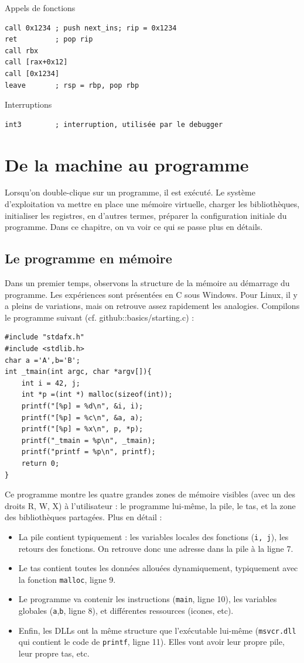 \documentclass{book}
\newcommand{\C}{\textsc{C}\xspace}
\newcommand{\code}[1]{\texttt{#1}}
\begin{document}
Appels de fonctions
\begin{verbatim}
call 0x1234 ; push next_ins; rip = 0x1234
ret         ; pop rip
call rbx
call [rax+0x12]
call [0x1234]
leave       ; rsp = rbp, pop rbp
\end{verbatim}

Interruptions
\begin{verbatim}
int3        ; interruption, utilisée par le debugger
\end{verbatim}

\chapter{De la machine au programme}

Lorsqu'on double-clique sur un programme, il est exécuté. Le système d'exploitation va mettre en place une mémoire virtuelle, charger les bibliothèques, initialiser les registres, en d'autres termes, préparer la configuration initiale du programme. Dans ce chapitre, on va voir ce qui se passe plus en détails. 

\section{Le programme en mémoire}

Dans un premier temps, observons la structure de la mémoire au démarrage du programme. Les expériences sont présentées en \C sous Windows. Pour Linux, il y a pleins de variations, mais on retrouve assez rapidement les analogies. Compilons le programme suivant (cf. github::basics/starting.c) : 

\begin{verbatim}
#include "stdafx.h"
#include <stdlib.h>
char a ='A',b='B';
int _tmain(int argc, char *argv[]){
	int i = 42, j;
	int *p =(int *) malloc(sizeof(int));
	printf("[%p] = %d\n", &i, i);
	printf("[%p] = %c\n", &a, a);
	printf("[%p] = %x\n", p, *p);
	printf("_tmain = %p\n", _tmain);
	printf("printf = %p\n", printf);
	return 0;
}
\end{verbatim}

Ce programme montre les quatre grandes zones de mémoire visibles (avec un des droits R, W, X) à l'utilisateur :  le programme lui-même, la pile, le tas, et la zone des bibliothèques partagées. Plus en détail : 
\begin{itemize}
	\item La pile contient typiquement : les variables locales des fonctions (\code{i, j}), les retours des fonctions. On retrouve donc une adresse dans la pile à la ligne 7. 
	\item Le tas contient toutes les données allouées dynamiquement, typiquement avec la fonction \code{malloc}, ligne 9.  
	\item   Le programme va contenir les instructions (\code{main}, ligne 10), les variables globales (\code{a},\code{b}, ligne 8), et différentes ressources (icones, etc). 
	\item  Enfin, les DLLs ont la même structure que l'exécutable lui-même (\code{msvcr.dll} qui contient le code de \code{printf}, ligne 11). Elles vont avoir leur propre pile, leur propre tas, etc. 
\end{itemize}
\end{document}
